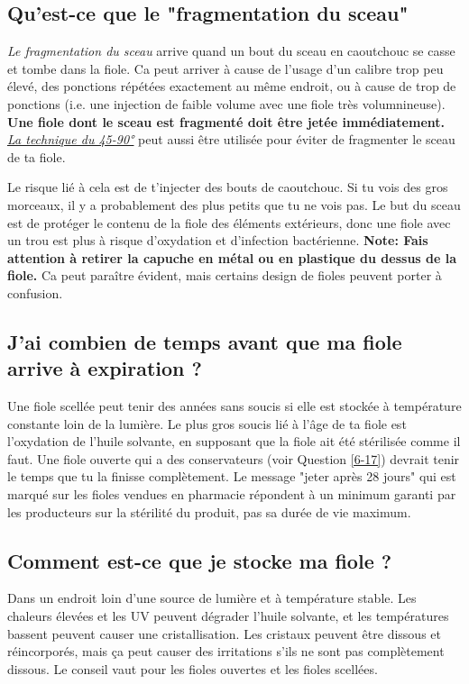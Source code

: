 \documentclass{article}
\begin{document}
\subsection{Qu'est-ce que le "fragmentation du sceau"}\label{5-23}

\textit{Le fragmentation du sceau} arrive quand un bout du sceau en caoutchouc se casse et tombe dans la fiole. Ca peut arriver à cause de l'usage d'un calibre trop peu élevé, des ponctions répétées exactement au même endroit, ou à cause de trop de ponctions (i.e. une injection de faible volume avec une fiole très volumnineuse). \textbf{Une fiole dont le sceau est fragmenté doit être jetée immédiatement.} \href{https://www.youtube.com/watch?v=w5F0SLoMjC8}{\textit{La technique du 45-90°}} peut aussi être utilisée pour éviter de fragmenter le sceau de ta fiole.

Le risque lié à cela est de t'injecter des bouts de caoutchouc. Si tu vois des gros morceaux, il y a probablement des plus petits que tu ne vois pas. Le but du sceau est de protéger le contenu de la fiole des éléments extérieurs, donc une fiole avec un trou est plus à risque d'oxydation et d'infection bactérienne. \textbf{Note: Fais attention à retirer la capuche en métal ou en plastique du dessus de la fiole.} Ca peut paraître évident, mais certains design de fioles peuvent porter à confusion.

\subsection{J'ai combien de temps avant que ma fiole arrive à expiration ?}

Une fiole scellée peut tenir des années sans soucis si elle est stockée à température constante loin de la lumière. Le plus gros soucis lié à l'âge de ta fiole est l'oxydation de l'huile solvante, en supposant que la fiole ait été stérilisée comme il faut. Une fiole ouverte qui a des conservateurs (voir Question \ref{6-17}) devrait tenir le temps que tu la finisse complètement. Le message "jeter après 28 jours" qui est marqué sur les fioles vendues en pharmacie répondent à un minimum garanti par les producteurs sur la stérilité du produit, pas sa durée de vie maximum.

\subsection{Comment est-ce que je stocke ma fiole ?}\label{5-25}

Dans un endroit loin d'une source de lumière et à température stable. Les chaleurs élevées et les UV peuvent dégrader l'huile solvante, et les températures bassent peuvent causer une cristallisation. Les cristaux peuvent être dissous et réincorporés, mais ça peut causer des irritations s'ils ne sont pas complètement dissous. Le conseil vaut pour les fioles ouvertes et les fioles scellées.
\end{document}

